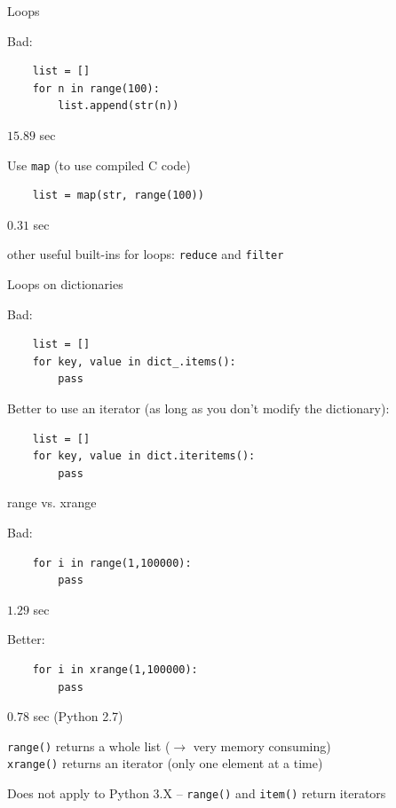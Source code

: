 \documentclass[t,handout]{beamer}
\begin{document}
\begin{frame}[c,fragile]{Loops}

Bad:
\begin{verbatim}
    list = []
    for n in range(100):
        list.append(str(n))
\end{verbatim}

$15.89$ sec

\medskip
\pause
Use \texttt{map} (to use compiled C code)
\begin{verbatim}
    list = map(str, range(100))
\end{verbatim}

$0.31$ sec

\medskip

other useful built-ins for loops: \texttt{reduce} and \texttt{filter}

\end{frame}
\begin{frame}[c,fragile]{Loops on dictionaries}

Bad:
\begin{verbatim}
    list = []
    for key, value in dict_.items():
        pass
\end{verbatim}

\medskip
\pause

Better to use an iterator (as long as you don't modify the dictionary):
\begin{verbatim}
    list = []
    for key, value in dict.iteritems():
        pass
\end{verbatim}

\end{frame}
\begin{frame}[c,fragile]{range vs. xrange}

Bad:
\begin{verbatim}
    for i in range(1,100000):
        pass 
\end{verbatim}

$1.29$ sec 

\medskip
\pause

Better:
\begin{verbatim}
    for i in xrange(1,100000):
        pass 
\end{verbatim}

$0.78$ sec (Python 2.7)

\medskip

\texttt{range()} returns a whole list ($\to$ very memory consuming)\\
\texttt{xrange()} returns an iterator (only one element at a time)

\medskip

Does not apply to Python 3.X -- \texttt{range()} and \texttt{item()} return iterators

\end{frame}
\end{document}
